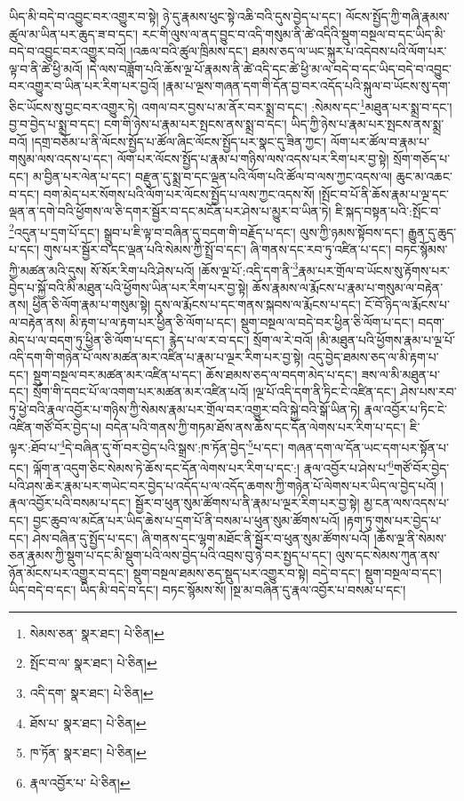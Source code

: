 ཡིད་མི་བདེ་བ་འབྱུང་བར་འགྱུར་བ་སྟེ། ཉེ་དུ་རྣམས་ཕུང་སྟེ་འཆི་བའི་དུས་བྱེད་པ་དང་། ལོངས་སྤྱོད་ཀྱི་གཞི་རྣམས་ཚུལ་མ་ཡིན་པར་ཆུད་ཟ་བ་དང་། རང་གི་ལུས་ལ་ནད་བྱུང་བ་འདི་གསུམ་ནི་ཚེ་འདིའི་སྡུག་བསྔལ་བ་དང་ཡིད་མི་བདེ་བ་འབྱུང་བར་འགྱུར་བའོ། །འཆལ་བའི་ཚུལ་ཁྲིམས་དང་། ཐམས་ཅད་ལ་ཡང་སྐུར་པ་འདེབས་པའི་ལོག་པར་ལྟ་བ་ནི་ཚེ་ཕྱི་མའོ། །དེ་ལས་བཟློག་པའི་ཆོས་ལྔ་པོ་རྣམས་ནི་ཚེ་འདི་དང་ཚེ་ཕྱི་མ་ལ་བདེ་བ་དང་ཡིད་བདེ་བ་འབྱུང་བར་འགྱུར་བ་ཡིན་པར་རིག་པར་བྱའོ། །རྣམ་པ་ལྔས་གཞན་དག་གི་དོན་བྱ་བར་འདོད་པའི་སྐུལ་བ་ཡོངས་སུ་དག་ཅིང་ཡོངས་སུ་བྱང་བར་འགྱུར་ཏེ། འགལ་བར་བྱས་པ་མ་ནོར་བར་སྨྲ་བ་དང་། :སེམས་དང་\footnote{སེམས་ཅན་  སྣར་ཐང་།  པེ་ཅིན། }མཐུན་པར་སྨྲ་བ་དང་། བྱ་བ་བྱེད་པ་སྨྲ་བ་དང་། ངག་གི་ཉེས་པ་རྣམ་པར་སྤངས་ནས་སྨྲ་བ་དང་། ཡིད་ཀྱི་ཉེས་པ་རྣམ་པར་སྤངས་ནས་སྨྲ་བའོ། །དགྲ་བཅོམ་པ་ནི་ལོངས་སྤྱོད་པ་ཚོལ་ཞིང་ལོངས་སྤྱོད་པར་སྣང་དུ་ཟིན་ཀྱང་། ལོག་པར་ཚོལ་བ་རྣམ་པ་གསུམ་ལས་འདས་པ་དང་། ལོག་པར་ལོངས་སྤྱོད་པ་རྣམ་པ་གཉིས་ལས་འདས་པར་རིག་པར་བྱ་སྟེ། སྲོག་གཅོད་པ་དང་། མ་བྱིན་པར་ལེན་པ་དང་། བརྫུན་དུ་སྨྲ་བ་དང་ལྡན་པའི་ལོག་པའི་ཚོལ་བ་ལས་ཀྱང་འདས་ལ། ཆུང་མ་འཆང་བ་དང་། བག་མེད་པར་སོགས་པའི་ལོག་པར་ལོངས་སྤྱོད་པ་ལས་ཀྱང་འདས་སོ། །སྤོང་བ་པོ་ནི་ཆོས་རྣམ་པ་ལྔ་དང་ལྡན་ན་དགེ་བའི་ཕྱོགས་ལ་ཅི་དགར་སྦྱོར་བ་དང་མངོན་པར་ཤེས་པ་མྱུར་བ་ཡིན་ཏེ། ཇི་སྐད་བསྟན་པའི་:སྤོང་བ་\footnote{སྤོང་བ་ལ་  སྣར་ཐང་།  པེ་ཅིན། }འདུན་པ་དྲག་པོ་དང་། སྒྲུབ་པ་ཇི་ལྟ་བ་བཞིན་དུ་བདག་གི་བརྗོད་པ་དང་། ལུས་ཀྱི་ཉམས་སྟོབས་དང་། རྒྱུན་དུ་ཆུད་པ་དང་། གུས་པར་སྦྱོར་བ་དང་ལྡན་པའི་སེམས་ཀྱི་སྤྲོ་བ་དང་། ཞི་གནས་དང་རབ་ཏུ་འཛིན་པ་དང་། བཏང་སྙོམས་ཀྱི་མཚན་མའི་དུས། སོ་སོར་རིག་པའི་ཤེས་པའོ། །ཆོས་ལྔ་པོ་:འདི་དག་ནི་\footnote{འདི་དག་  སྣར་ཐང་།  པེ་ཅིན། }རྣམ་པར་གྲོལ་བ་ཡོངས་སུ་རྟོགས་པར་བྱེད་པ་སྐྱོ་བའི་མི་མཐུན་པའི་ཕྱོགས་ཡིན་པར་རིག་པར་བྱ་སྟེ། ཆོས་རྣམས་ལ་རྨོངས་པ་རྣམ་པ་གསུམ་ལ་བརྟེན་ནས། ཕྱིན་ཅི་ལོག་རྣམ་པ་གསུམ་སྟེ། དུས་ལ་རྨོངས་པ་དང་གནས་སྐབས་ལ་རྨོངས་པ་དང་། ངོ་བོ་ཉིད་ལ་རྨོངས་པ་ལ་བརྟེན་ནས། མི་རྟག་པ་ལ་རྟག་པར་ཕྱིན་ཅི་ལོག་པ་དང་། སྡུག་བསྔལ་ལ་བདེ་བར་ཕྱིན་ཅི་ལོག་པ་དང་། བདག་མེད་པ་ལ་བདག་ཏུ་ཕྱིན་ཅི་ལོག་པ་དང་། རྙེད་པ་ལ་ར་བ་དང་། སྲོག་ལ་རེ་བའོ། །མི་མཐུན་པའི་ཕྱོགས་རྣམ་པ་ལྔ་པོ་འདི་དག་གི་གཉེན་པོ་ལས་མཚན་མར་འཛིན་པ་རྣམ་པ་ལྔར་རིག་པར་བྱ་སྟེ། འདུ་བྱེད་ཐམས་ཅད་ལ་མི་རྟག་པ་དང་། སྡུག་བསྔལ་བར་མཚན་མར་འཛིན་པ་དང་། ཆོས་ཐམས་ཅད་ལ་བདག་མེད་པ་དང་། ཟས་ལ་མི་མཐུན་པ་དང་། སྲོག་གི་དབང་པོ་ལ་འགག་པར་མཚན་མར་འཛིན་པའོ། །ལྔ་པོ་འདི་དག་ནི་ཏིང་ངེ་འཛིན་དང་། ཤེས་པས་རབ་ཏུ་ཕྱེ་བའི་རྣལ་འབྱོར་པ་གཉིས་ཀྱི་སེམས་རྣམ་པར་གྲོལ་བར་འགྱུར་བའི་སྐྱེ་བའི་སྒོ་ཡིན་ཏེ། རྣལ་འབྱོར་པ་ཏིང་ངེ་འཛིན་གཙོ་བོར་བྱེད་པ། བདེན་པའི་གནས་ཀྱི་གཏམ་ཐོས་ནས་ཆོས་དང་དོན་ལེགས་པར་རིག་པ་དང་། ཇི་ལྟར་:ཐོབ་པ་\footnote{ཐོས་པ་  སྣར་ཐང་།  པེ་ཅིན། }དེ་བཞིན་དུ་གོ་བར་བྱེད་པའི་སྒྲས་:ཁ་ཏོན་བྱེད་\footnote{ཁ་ཏོན་  སྣར་ཐང་།  པེ་ཅིན། }པ་དང་། གཞན་དག་ལ་དོན་ཡང་དག་པར་སྟོན་པ་དང་། ལྐོག་ན་འདུག་ཅིང་སེམས་ཏེ་ཆོས་དང་དོན་ལེགས་པར་རིག་པ་དང་:། རྣལ་འབྱོར་པ་ཤེས་པ་\footnote{རྣལ་འབྱོར་པ་  པེ་ཅིན། }གཙོ་བོར་བྱེད་པའི་ཤས་ཆེར་རྣམ་པར་གཡེང་བར་བྱེད་པ་འདོད་པ་ལ་འདོད་ཆགས་ཀྱི་གཉེན་པོ་ལེགས་པར་ཡིད་ལ་བྱེད་པའོ། །རྣལ་འབྱོར་པའི་བསམ་པ་དང་། སྦྱོར་བ་ཕུན་སུམ་ཚོགས་པ་ནི་རྣམ་པ་ལྔར་རིག་པར་བྱ་སྟེ། མྱ་ངན་ལས་འདས་པ་དང་། བྱང་ཆུབ་ལ་མངོན་པར་ཡིད་ཆེས་པ་དྲག་པོ་ནི་བསམ་པ་ཕུན་སུམ་ཚོགས་པའོ། །རྟག་ཏུ་གུས་པར་བྱེད་པ་དང་། ཤེས་བཞིན་དུ་སྤྱོད་པ་དང་། ཞི་གནས་དང་ལྷག་མཐོང་ནི་སྦྱོར་བ་ཕུན་སུམ་ཚོགས་པའོ། །ཆོས་ལྔ་ནི་སེམས་ཅན་རྣམས་ཀྱི་སྡུག་པ་དང་མི་སྡུག་པའི་ལས་བྱེད་པའི་འབྲས་བུ་ཉེ་བར་སྤྱད་པ་དང་། ལུས་དང་སེམས་ཀུན་ནས་ཉོན་མོངས་པར་འགྱུར་བ་དང་། སྡུག་བསྔལ་ཐམས་ཅད་སྡུད་པར་འགྱུར་བ་སྟེ། བདེ་བ་དང་། སྡུག་བསྔལ་བ་དང་། ཡིད་བདེ་བ་དང་། ཡིད་མི་བདེ་བ་དང་། བཏང་སྙོམས་སོ། །སྔ་མ་བཞིན་དུ་རྣལ་འབྱོར་པ་བསམ་པ་དང་། 